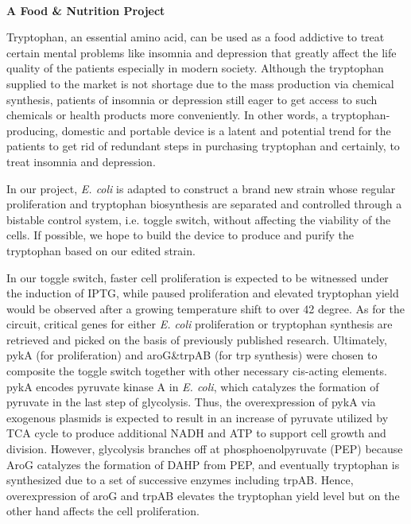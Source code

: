 \textbf{\\A Food & Nutrition Project\\}\begin{spacing}{1.5}

Tryptophan, an essential amino acid, can be used as a food addictive to treat certain mental problems like insomnia and depression that greatly affect the life quality of the patients especially in modern society. Although the tryptophan supplied to the market is not shortage due to the mass production via chemical synthesis, patients of insomnia or depression still eager to get access to such chemicals or health products more conveniently. In other words, a tryptophan-producing, domestic and portable device is a latent and potential trend for the patients to get rid of redundant steps in purchasing tryptophan and certainly, to treat insomnia and depression.

In our project, \textit{E. coli} is adapted to construct a brand new strain whose regular proliferation and tryptophan biosynthesis are separated and controlled through a bistable control system, i.e. toggle switch, without affecting the viability of the cells. If possible, we hope to build the device to produce and purify the tryptophan based on our edited strain.

In our toggle switch, faster cell proliferation is expected to be witnessed under the induction of IPTG, while paused proliferation and elevated tryptophan yield would be observed after a growing temperature shift to over 42 degree. As for the circuit, critical genes for either \textit{E. coli} proliferation or tryptophan synthesis are retrieved and picked on the basis of previously published research. Ultimately, pykA (for proliferation) and aroG&trpAB (for trp synthesis) were chosen to composite the toggle switch together with other necessary cis-acting elements. pykA encodes pyruvate kinase A in \textit{E. coli}, which catalyzes the formation of pyruvate in the last step of glycolysis. Thus, the overexpression of pykA via exogenous plasmids is expected to result in an increase of pyruvate utilized by TCA cycle to produce additional NADH and ATP to support cell growth and division. However, glycolysis branches off at phosphoenolpyruvate (PEP) because AroG catalyzes the formation of DAHP from PEP, and eventually tryptophan is synthesized due to a set of successive enzymes including trpAB. Hence, overexpression of aroG and trpAB elevates the tryptophan yield level but on the other hand affects the cell proliferation.\end{spacing}
\\

